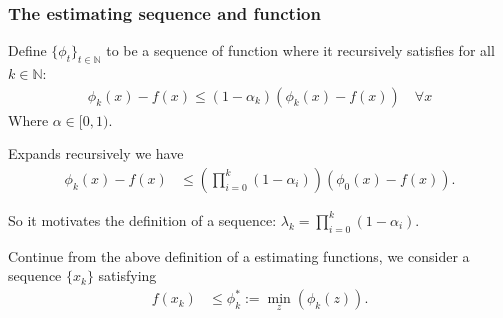 \documentclass[12pt]{article}
\begin{document}
    \subsubsection{The estimating sequence and function}
        \begin{definition}
            Define  $\{\phi_t\}_{t\in \mathbb N}$ to be a sequence of function where it recursively satisfies for all $k\in \mathbb N$: 
            \begin{align*}
                \phi_{k} (x) - f(x) \le 
                (1 - \alpha_k)(\phi_k(x) - f(x)) \quad \forall x 
            \end{align*}
            Where $\alpha \in [0, 1)$. 
        \end{definition}
        \begin{observation}
            Expands recursively we have 
            \begin{align*}
                \phi_{k}(x) - f(x) &\le 
                \left(
                    \prod_{i = 0}^{k} 
                    (1 - \alpha_i)
                \right)(\phi_0(x) - f(x)). 
            \end{align*}
        \end{observation}
        So it motivates the definition of a sequence: $\lambda_k = \prod_{i=0}^k(1 - \alpha_i)$. 

        \begin{definition}
            Continue from the above definition of a estimating functions, we consider a sequence $\{x_k\}$ satisfying 
            \begin{align*}
                f(x_k) &\le \phi_k^* := \min_z(\phi_k(z)). 
            \end{align*}
        \end{definition}
        
\end{document}
